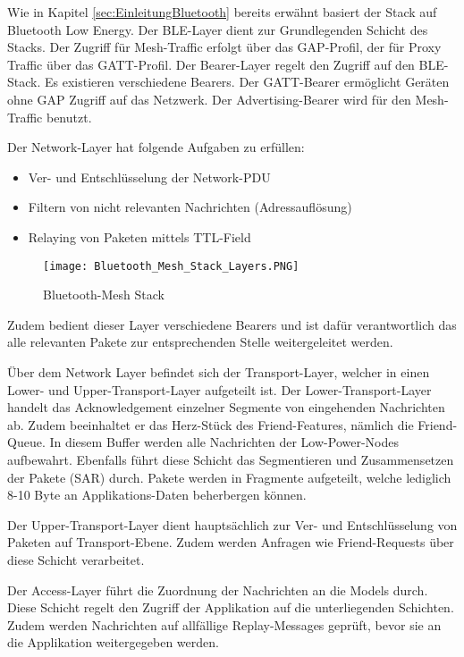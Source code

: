 Wie in Kapitel \ref{sec:EinleitungBluetooth} bereits erwähnt basiert der Stack auf Bluetooth Low Energy. Der BLE-Layer dient zur Grundlegenden Schicht des Stacks. Der Zugriff für Mesh-Traffic erfolgt über das GAP-Profil, der für Proxy Traffic über das GATT-Profil. Der Bearer-Layer regelt den Zugriff auf den BLE-Stack. Es existieren verschiedene Bearers. Der GATT-Bearer ermöglicht Geräten ohne GAP Zugriff auf das Netzwerk. Der Advertising-Bearer wird für den Mesh-Traffic benutzt. 

Der Network-Layer hat folgende Aufgaben zu erfüllen: 

\begin{itemize}
	\item Ver- und Entschlüsselung der Network-PDU
	\item Filtern von nicht relevanten Nachrichten (Adressauflösung)
	\item Relaying von Paketen mittels TTL-Field
\end{itemize}

\begin{wrapfigure}{r}{0.5\textwidth}
	\centering
	\texttt{[image: Bluetooth\_Mesh\_Stack\_Layers.PNG]}
	\caption{Bluetooth-Mesh Stack \cite{bluetooth_sig_mesh-technology-overviewpdf_2020}} 
	\label{fig:BTMeshStack}
\end{wrapfigure}

Zudem bedient dieser Layer verschiedene Bearers und ist dafür verantwortlich das alle relevanten Pakete zur entsprechenden Stelle weitergeleitet werden.

Über dem Network Layer befindet sich der Transport-Layer, welcher in einen Lower- und Upper-Transport-Layer aufgeteilt ist. Der Lower-Transport-Layer handelt das Acknowledgement einzelner Segmente von eingehenden Nachrichten ab. Zudem beeinhaltet er das Herz-Stück des Friend-Features, nämlich die Friend-Queue. In diesem Buffer werden alle Nachrichten der  Low-Power-Nodes aufbewahrt. Ebenfalls führt diese Schicht das Segmentieren und Zusammensetzen der Pakete (SAR) durch. Pakete werden in Fragmente aufgeteilt, welche lediglich 8-10 Byte an Applikations-Daten beherbergen können.

Der Upper-Transport-Layer dient hauptsächlich zur Ver- und Entschlüsselung von Paketen auf Transport-Ebene. Zudem werden Anfragen wie Friend-Requests über diese Schicht verarbeitet.

Der Access-Layer führt die Zuordnung der Nachrichten an die Models durch. Diese Schicht regelt den Zugriff der Applikation auf die unterliegenden Schichten. Zudem werden Nachrichten auf allfällige Replay-Messages geprüft, bevor sie an die Applikation weitergegeben werden.

